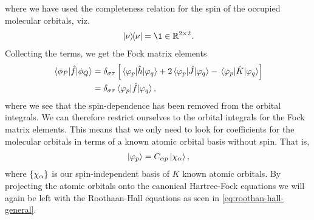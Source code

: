             where we have used the completeness relation for the spin of the
            occupied molecular orbitals, viz.
            \begin{align}
                \dyad*{\nu}
                = \1 \in \mathbb{R}^{2 \times 2}.
            \end{align}
            Collecting the terms, we get the Fock matrix elements
            \begin{align}
                \mel*{\phi_P}{\hat{f}}{\phi_Q}
                &=
                \delta_{\sigma\tau}
                \left[ 
                    \mel*{\varphi_p}{\hat{h}}{\varphi_q}
                    +
                    2
                    \mel*{\varphi_p}{\hat{J}}{\varphi_q}
                    -
                    \mel*{\varphi_p}{\hat{K}}{\varphi_q}
                 \right]
                \\
                &=
                \delta_{\sigma\tau}
                \mel*{\varphi_p}{\hat{f}}{\varphi_q},
            \end{align}
            where we see that the spin-dependence has been removed from the
            orbital integrals.
            We can therefore restrict ourselves to the orbital integrals for the
            Fock matrix elements.
            This means that we only need to look for coefficients for the
            molecular orbitals in terms of a known atomic orbital basis without
            spin.
            That is,
            \begin{align}
                \ket*{\varphi_p} = C_{\alpha p} \ket*{\chi_{\alpha}},
            \end{align}
            where $\left\{ \chi_{\alpha} \right\}$ is our spin-independent basis of $K$
            known atomic orbitals.
            By projecting the atomic orbitals onto the canonical Hartree-Fock
            equations we will again be left with the Roothaan-Hall equations as
            seen in \autoref{eq:roothan-hall-general}.

